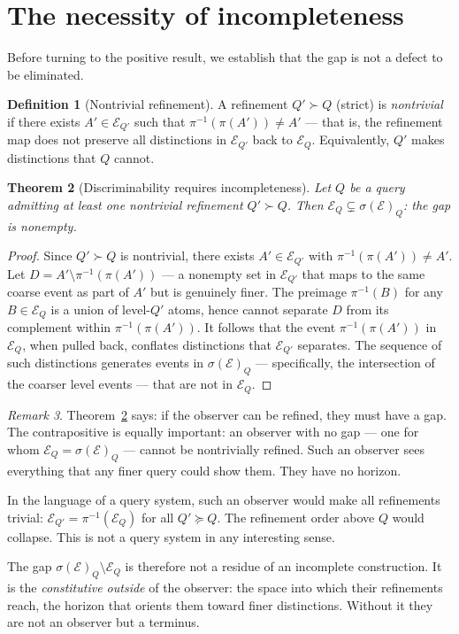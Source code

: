 \documentclass[12pt]{article}
\newtheorem{theorem}{Theorem}[section]
\theoremstyle{definition}
\newtheorem{definition}[theorem]{Definition}
\theoremstyle{remark}
\newtheorem{remark}[theorem]{Remark}
\newcommand{\E}{\mathcal{E}}
\newcommand{\sigE}{\sigma(\mathcal{E})}
\begin{document}
\section{The necessity of incompleteness}
\label{sec:incompleteness}

Before turning to the positive result, we establish that the gap is not a defect
to be eliminated.

\begin{definition}[Nontrivial refinement]
\label{def:nontrivial}
A refinement $Q' \succ Q$ (strict) is \emph{nontrivial} if there exists
$A' \in \E_{Q'}$ such that $\pi^{-1}(\pi(A')) \neq A'$ --- that is, the refinement
map does not preserve all distinctions in $\E_{Q'}$ back to $\E_Q$.  Equivalently,
$Q'$ makes distinctions that $Q$ cannot.
\end{definition}

\begin{theorem}[Discriminability requires incompleteness]
\label{thm:incompleteness}
Let $Q$ be a query admitting at least one nontrivial refinement $Q' \succ Q$.
Then $\E_Q \subsetneq \sigE_Q$: the gap is nonempty.
\end{theorem}

\begin{proof}
Since $Q' \succ Q$ is nontrivial, there exists $A' \in \E_{Q'}$ with
$\pi^{-1}(\pi(A')) \neq A'$.  Let $D = A' \setminus \pi^{-1}(\pi(A'))$ --- a
nonempty set in $\E_{Q'}$ that maps to the same coarse event as part of $A'$ but
is genuinely finer.  The preimage $\pi^{-1}(B)$ for any $B \in \E_Q$ is a union
of level-$Q'$ atoms, hence cannot separate $D$ from its complement within
$\pi^{-1}(\pi(A'))$.  It follows that the event $\pi^{-1}(\pi(A'))$ in $\E_Q$,
when pulled back, conflates distinctions that $\E_{Q'}$ separates.  The sequence
of such distinctions generates events in $\sigE_Q$ --- specifically, the intersection
of the coarser level events --- that are not in $\E_Q$.
\end{proof}

\begin{remark}
Theorem~\ref{thm:incompleteness} says: if the observer can be refined, they must
have a gap.  The contrapositive is equally important: an observer with no gap ---
one for whom $\E_Q = \sigE_Q$ --- cannot be nontrivially refined.  Such an observer
sees everything that any finer query could show them.  They have no horizon.

In the language of a query system, such an observer would make all refinements trivial:
$\E_{Q'} = \pi^{-1}(\E_Q)$ for all $Q' \succeq Q$.  The refinement order above
$Q$ would collapse.  This is not a query system in any interesting sense.

The gap $\sigE_Q \setminus \E_Q$ is therefore not a residue of an incomplete
construction.  It is the \emph{constitutive outside} of the observer: the space
into which their refinements reach, the horizon that orients them toward finer
distinctions.  Without it they are not an observer but a terminus.
\end{remark}
\end{document}
